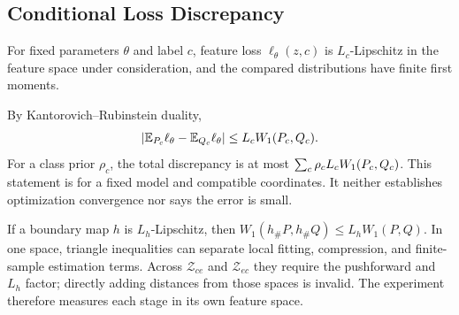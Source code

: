 \subsection{Conditional Loss Discrepancy}
\begin{assumption}\label{ass:lip}
For fixed parameters $\theta$ and label $c$, feature loss $\ell_\theta(z,c)$ is $L_c$-Lipschitz in the feature space under consideration, and the compared distributions have finite first moments.
\end{assumption}
By Kantorovich--Rubinstein duality,
\begin{equation}\label{eq:lossbound}
|\mathbb{E}_{P_c}\ell_\theta-\mathbb{E}_{Q_c}\ell_\theta|\le L_cW_1(P_c,Q_c).
\end{equation}
For a class prior $\rho_c$, the total discrepancy is at most $\sum_c\rho_cL_cW_1(P_c,Q_c)$. This statement is for a fixed model and compatible coordinates. It neither establishes optimization convergence nor says the error is small.

If a boundary map $h$ is $L_h$-Lipschitz, then $W_1(h_\#P,h_\#Q)\le L_hW_1(P,Q)$. In one space, triangle inequalities can separate local fitting, compression, and finite-sample estimation terms. Across $\mathcal Z_{ce}$ and $\mathcal Z_{ec}$ they require the pushforward and $L_h$ factor; directly adding distances from those spaces is invalid. The experiment therefore measures each stage in its own feature space.

